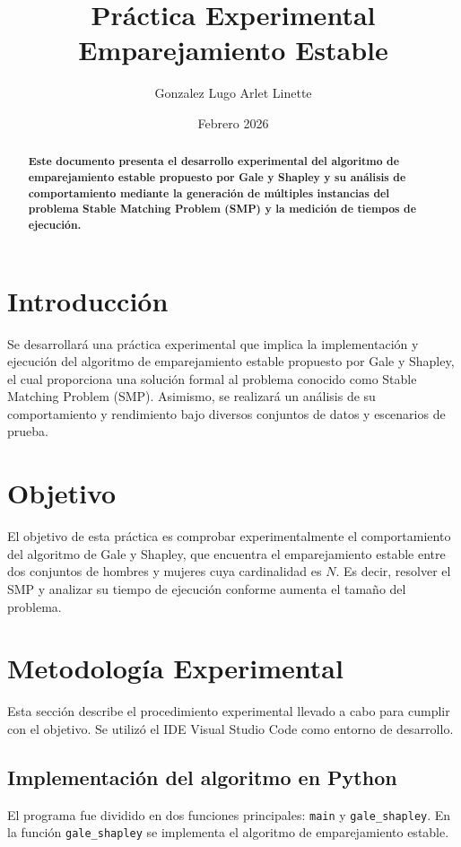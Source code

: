 \documentclass{article}
\title{Práctica Experimental \\ Emparejamiento Estable}
\author{Gonzalez Lugo Arlet Linette}
\date{Febrero 2026}
\begin{document}
\maketitle

\begin{abstract}
\textbf{Este documento presenta el desarrollo experimental del algoritmo de emparejamiento estable propuesto por Gale y Shapley y su análisis de comportamiento mediante la generación de múltiples instancias del problema Stable Matching Problem (SMP) y la medición de tiempos de ejecución.}
\end{abstract}

\renewcommand{\thesection}{\Roman{section}}

\section{Introducción}
Se desarrollará una práctica experimental que implica la implementación y ejecución del algoritmo de emparejamiento estable propuesto por Gale y Shapley, el cual proporciona una solución formal al problema conocido como Stable Matching Problem (SMP). Asimismo, se realizará un análisis de su comportamiento y rendimiento bajo diversos conjuntos de datos y escenarios de prueba.

\section{Objetivo}
El objetivo de esta práctica es comprobar experimentalmente el comportamiento del algoritmo de Gale y Shapley, que encuentra el emparejamiento estable entre dos conjuntos de hombres y mujeres cuya cardinalidad es $N$. Es decir, resolver el SMP y analizar su tiempo de ejecución conforme aumenta el tamaño del problema.

\section{Metodología Experimental}
Esta sección describe el procedimiento experimental llevado a cabo para cumplir con el objetivo. Se utilizó el IDE Visual Studio Code como entorno de desarrollo.

\subsection{Implementación del algoritmo en Python}
El programa fue dividido en dos funciones principales: \texttt{main} y \texttt{gale\_shapley}. En la función \texttt{gale\_shapley} se implementa el algoritmo de emparejamiento estable.
\end{document}
